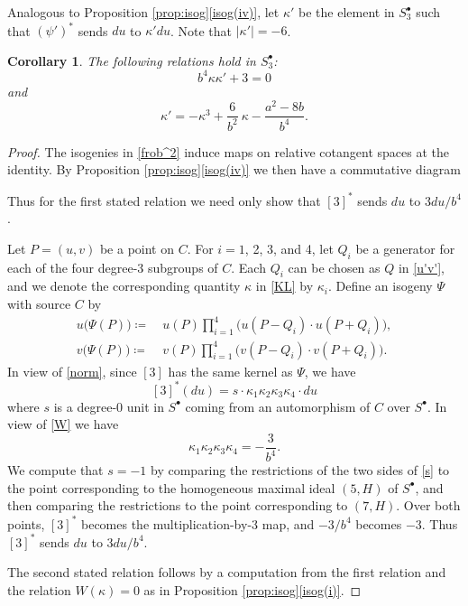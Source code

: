 \documentclass{gtpart}
\newtheorem{cor}[thm]{Corollary}
\theoremstyle{definition}
\theoremstyle{remark}
\newcommand{\K}{\kappa}
\newcommand{\s}{S^\bullet}
\newcommand{\ce}{\coloneqq}
\newcommand{\isog}[1]{Proposition \ref{prop:isog}\thinspace \eqref{isog(#1)}}
\numberwithin{equation}{section}
\numberwithin{thm}{section}
\begin{document}
Analogous to \isog{iv}, let $\K'$ be the element in $\s_3$ such that 
$(\psi')^*$ sends $du$ to $\K' du$.  Note that $|\K'| = -6$.  

\begin{cor}
\label{cor:K'}
 The following relations hold in $\s_3$: 
 \[
  b^4 \K \K' + 3 = 0 
 \]
 and 
 \[
  \K' = -\K^3 + \frac{6}{b^2} ~ \K - \frac{a^2 - 8 b}{b^4}.  
 \]
\end{cor}
\begin{proof}
 The isogenies in \eqref{frob^2} induce maps on relative cotangent 
 spaces at the identity.  By \isog{iv} we then have a commutative 
 diagram 
 \begin{center}
 \end{center}
 Thus for the first stated relation we need only show that $[3]^*$ sends 
 $du$ to $3 du / b^4$.  

 Let $P = (u,v)$ be a point on $C$.  For $i = 1$, 2, 3, and 4, let $Q_i$ 
 be a generator for each of the four degree-3 subgroups of $C$.  Each 
 $Q_i$ can be chosen as $Q$ in \eqref{u'v'}, and we denote the 
 corresponding quantity $\K$ in \eqref{KL} by $\K_i$.  Define an isogeny 
 $\Psi$ with source $C$ by 
 \begin{equation}
 \label{Psi}
 \begin{split}
  u\big( \Psi(P) \big) \ce & ~ u(P) \prod_{i=1}^4 \big( u(P-Q_i) \cdot u(P+Q_i) \big), \\
  v\big( \Psi(P) \big) \ce & ~ v(P) \prod_{i=1}^4 \big( v(P-Q_i) \cdot v(P+Q_i) \big).  
 \end{split}
 \end{equation}
 In view of \eqref{norm}, since $[3]$ has the same kernel as $\Psi$, we 
 have 
 \begin{equation}
 \label{s}
  [3]^* (du) = s \cdot \K_1 \K_2 \K_3 \K_4 \cdot du 
 \end{equation}
 where $s$ is a degree-0 unit in $\s$ coming from an automorphism of $C$ 
 over $\s$.  In view of \eqref{W} we have 
 \[
  \K_1 \K_2 \K_3 \K_4 = -\frac{3}{b^4}.  
 \]
 We compute that $s = -1$ by comparing the restrictions of the two sides 
 of \eqref{s} to the point corresponding to the homogeneous maximal 
 ideal $(5,H)$ of $\s$, and then comparing the restrictions to the point 
 corresponding to $(7,H)$.  Over both points, $[3]^*$ becomes the 
 multiplication-by-3 map, and $-3 / b^4$ becomes $-3$.  Thus $[3]^*$ 
 sends $du$ to $3 du / b^4$.  

 The second stated relation follows by a computation from the first 
 relation and the relation $W(\K) = 0$ as in \isog{i}.  
\end{proof}
\end{document}
